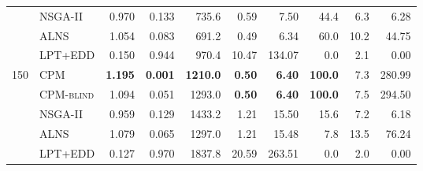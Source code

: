 \begin{tabular}{@{}llrrrrrrrr@{}}
 & \textsc{NSGA-II} & 0.970 & 0.133 & 735.6 & 0.59 & 7.50 & 44.4 & 6.3 & 6.28 \\
 & \textsc{ALNS} & 1.054 & 0.083 & 691.2 & 0.49 & 6.34 & 60.0 & 10.2 & 44.75 \\
 & \textsc{LPT+EDD} & 0.150 & 0.944 & 970.4 & 10.47 & 134.07 & 0.0 & 2.1 & 0.00 \\
\midrule
\multirow{5}{*}{150} & \textsc{CPM} & \textbf{1.195} & \textbf{0.001} & \textbf{1210.0} & \textbf{0.50} & \textbf{6.40} & \textbf{100.0} & 7.3 & 280.99 \\
 & \textsc{CPM-blind} & 1.094 & 0.051 & 1293.0 & \textbf{0.50} & \textbf{6.40} & \textbf{100.0} & 7.5 & 294.50 \\
 & \textsc{NSGA-II} & 0.959 & 0.129 & 1433.2 & 1.21 & 15.50 & 15.6 & 7.2 & 6.18 \\
 & \textsc{ALNS} & 1.079 & 0.065 & 1297.0 & 1.21 & 15.48 & 7.8 & 13.5 & 76.24 \\
 & \textsc{LPT+EDD} & 0.127 & 0.970 & 1837.8 & 20.59 & 263.51 & 0.0 & 2.0 & 0.00 \\
\bottomrule
\end{tabular}
